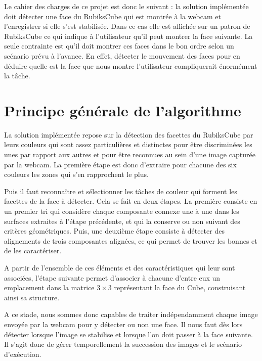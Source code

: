 \documentclass[a4paper,11pt]{article}
\begin{document}
Le cahier des charges de ce projet est donc le suivant : la solution implémentée doit détecter une face du 
RubiksCube qui est montrée à la webcam et l'enregistrer si elle s'est stabilisée. Dans ce cas elle est affichée
sur un patron de RubiksCube ce qui indique à l'utilisateur qu'il peut montrer la face suivante. La seule
contrainte est qu'il doit montrer ces faces dans le bon ordre selon un scénario prévu à l'avance. En effet, 
détecter le 
mouvement des faces pour en déduire quelle est la face que nous montre l'utilisateur compliquerait énormément 
la tâche.

\section{Principe générale de l'algorithme}
La solution implémentée repose sur la détection des facettes du RubiksCube par leurs couleurs qui sont assez
particulières et distinctes pour être discriminées les unes par rapport aux autres et pour être reconnues au 
sein d'une image capturée par la webcam. La première étape est donc d'extraire pour chacune des six couleurs
les zones qui s'en rapprochent le plus.

Puis il faut reconnaître et sélectionner les tâches de couleur qui forment les facettes de la face à détecter.
Cela se fait en deux étapes. La première consiste en un premier tri qui considère chaque composante connexe une 
à une dans les surfaces extraites à l'étape précédente, et qui la conserve ou non suivant des critères géométriques.
Puis, une deuxième étape consiste à détecter des alignements de trois composantes alignées, ce qui permet de 
trouver les bonnes et de les caractériser.

A partir de l'ensemble de ces éléments et des caractéristiques qui leur sont associées, l'étape suivante permet
d'associer à chacune d'entre eux un emplacement dans la matrice $3\times3$ représentant la face du Cube, 
construisant ainsi sa structure.

A ce stade, nous sommes donc capables de traiter indépendamment chaque image envoyée par la webcam pour y 
détecter ou non une face. Il nous faut dès lors détecter lorsque l'image se stabilise et lorsque l'on doit 
passer à la face suivante. Il s'agit donc de gérer temporellement la succession des images et le scénario 
d'exécution.
\end{document}
